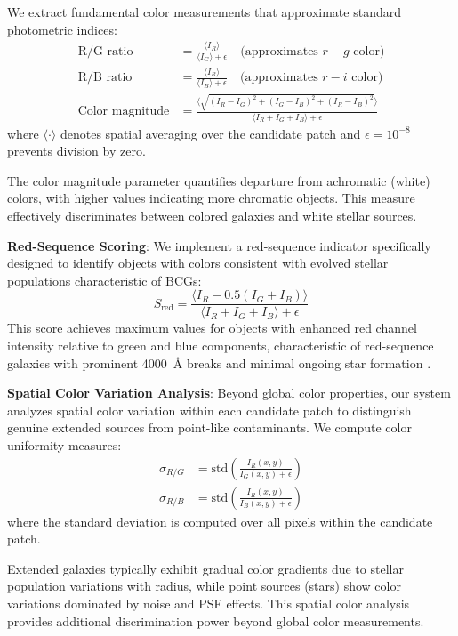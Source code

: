 \documentclass[twocolumn,10pt]{aastex631}
\begin{document}
We extract fundamental color measurements that approximate standard photometric indices:
\begin{align}
\text{R/G ratio} &= \frac{\langle I_R \rangle}{\langle I_G \rangle + \epsilon} \quad \text{(approximates } r-g \text{ color)} \\
\text{R/B ratio} &= \frac{\langle I_R \rangle}{\langle I_B \rangle + \epsilon} \quad \text{(approximates } r-i \text{ color)} \\
\text{Color magnitude} &= \frac{\langle\sqrt{(I_R-I_G)^2 + (I_G-I_B)^2 + (I_R-I_B)^2}\rangle}{\langle I_R + I_G + I_B \rangle + \epsilon}
\end{align}
where $\langle \cdot \rangle$ denotes spatial averaging over the candidate patch and $\epsilon = 10^{-8}$ prevents division by zero.

The color magnitude parameter quantifies departure from achromatic (white) colors, with higher values indicating more chromatic objects. This measure effectively discriminates between colored galaxies and white stellar sources.

\textbf{Red-Sequence Scoring}: We implement a red-sequence indicator specifically designed to identify objects with colors consistent with evolved stellar populations characteristic of BCGs:
\begin{equation}
S_{\text{red}} = \frac{\langle I_R - 0.5(I_G + I_B) \rangle}{\langle I_R + I_G + I_B \rangle + \epsilon}
\end{equation}
This score achieves maximum values for objects with enhanced red channel intensity relative to green and blue components, characteristic of red-sequence galaxies with prominent 4000~Å breaks and minimal ongoing star formation \citep{Kodama1997,Gladders2000}.

\textbf{Spatial Color Variation Analysis}: Beyond global color properties, our system analyzes spatial color variation within each candidate patch to distinguish genuine extended sources from point-like contaminants. We compute color uniformity measures:
\begin{align}
\sigma_{R/G} &= \text{std}\left(\frac{I_R(x,y)}{I_G(x,y) + \epsilon}\right) \\
\sigma_{R/B} &= \text{std}\left(\frac{I_R(x,y)}{I_B(x,y) + \epsilon}\right)
\end{align}
where the standard deviation is computed over all pixels within the candidate patch.

Extended galaxies typically exhibit gradual color gradients due to stellar population variations with radius, while point sources (stars) show color variations dominated by noise and PSF effects. This spatial color analysis provides additional discrimination power beyond global color measurements.
\end{document}
